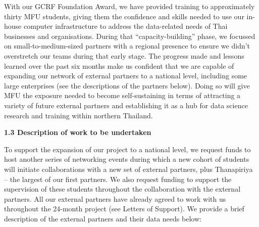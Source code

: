 \documentclass[11pt]{article}
\begin{document}
  \vspace{2mm}
  \noindent
  With our GCRF Foundation Award, we have provided training to approximately thirty MFU students, giving them the confidence and skills needed to use our in-house computer infrastructure to address the data-related needs of Thai businesses and organisations. During that ``capacity-building'' phase, we focussed on small-to-medium-sized partners with a regional presence to ensure we didn't overstretch our teams during that early stage. The progress made and lessons learned over the past six months make us confident that we are capable of expanding our network of external partners to a national level, including some large enterprises (see the descriptions of the partners below). Doing so will give MFU the exposure needed to become self-sustaining in terms of attracting a variety of future external partners and establishing it as a hub for data science research and training within northern Thailand.

  \vspace{2mm}
  \noindent
  {\large \bf 1.3 Description of work to be undertaken}
  
  \noindent
  To support the expansion of our project to a national level, we request funds to host another series of networking events during which a new cohort of students will initiate collaborations with a new set of external partners, plus Thanapiriya -- the largest of our first partners. We also request funding to support the supervision of these students throughout the collaboration with the external partners. All our external partners have already agreed to work with us throughout the 24-month project (see Letters of Support). We provide a brief description of the external partners and their data needs below:
  
\end{document}
